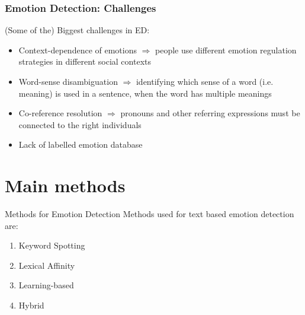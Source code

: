 \documentclass[xcolor=dvipsnames]{beamer}
\begin{document}
\begin{frame}
\frametitle{Emotion Detection: Challenges}
(Some of the) Biggest challenges in ED:
\begin{itemize}
\item Context-dependence of emotions $\Rightarrow $ people use different emotion regulation strategies in different social contexts
\item Word-sense disambiguation $\Rightarrow $ identifying which sense of a word (i.e. meaning) is used in a sentence, when the word has multiple meanings
\item Co-reference resolution $\Rightarrow $ pronouns and other referring expressions must be connected to the right individuals
\item Lack of labelled emotion database
\end{itemize}
\end{frame}

\section{Main methods}
\begin{frame}{Methods for Emotion Detection}
Methods used for text based emotion detection are: 
\begin{enumerate}
\item Keyword Spotting
\item Lexical Affinity
\item Learning-based 
\item Hybrid
\end{enumerate}
\end{frame}
\end{document}
